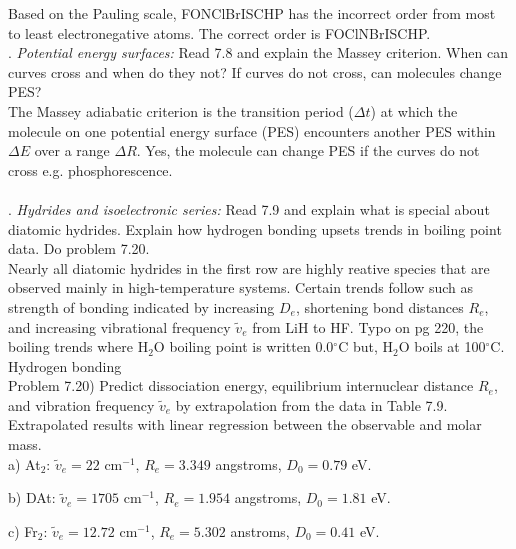 \documentclass{article}
\begin{document}
  {\color{blue}
  Based on the Pauling scale, FONClBrISCHP has the incorrect order from most to least electronegative
  atoms. The correct order is FOClNBrISCHP.}
  \\
  
  . \textit{Potential energy surfaces:} Read 7.8 and explain the Massey criterion.
  When can curves cross and when do they not? If curves do not cross, can molecules change
  PES?
  \\
  
  {\color{blue}
  The Massey adiabatic criterion is the transition period ($\Delta t$) at which the molecule
  on one potential energy surface (PES) encounters another PES within $\Delta E$ over a range
  $\Delta R$. Yes, the molecule can change PES if the curves do not cross e.g. phosphorescence.}
  \\
  \\
  . \textit{Hydrides and isoelectronic series:} Read 7.9 and explain what is special
  about diatomic hydrides. Explain how hydrogen bonding upsets trends in boiling point
  data. Do problem 7.20.
  \\
  
  {\color{blue}
  Nearly all diatomic hydrides in the first row are highly reative species that are
  observed mainly in high-temperature systems. Certain trends follow such as strength
  of bonding indicated by increasing $D_e$, shortening bond distances $R_e$, and
  increasing vibrational frequency $\tilde{v}_e$ from LiH to HF. Typo on pg 220, the
  boiling trends where H$_2$O boiling point is written 0.0$^{\circ}$C but, H$_2$O boils
  at 100$^{\circ}$C. Hydrogen bonding}
  \\
  
  Problem 7.20) Predict dissociation energy, equilibrium internuclear distance $R_e$,
  and vibration frequency $\tilde{v}_e$ by extrapolation from the data in Table 7.9.
  \\

  \color{blue}
  Extrapolated results with linear regression between the observable and molar mass.
  \\
  
  a) At$_2$: $\tilde{v}_e=22$ cm$^{-1}$, $R_e=3.349$ angstroms, $D_0=0.79$ eV.

  b) DAt: $\tilde{v}_e=1705$ cm$^{-1}$, $R_e=1.954$ angstroms, $D_0=1.81$ eV.

  c) Fr$_2$: $\tilde{v}_e=12.72$ cm$^{-1}$, $R_e=5.302$ anstroms, $D_0=0.41$ eV.
\end{document}
